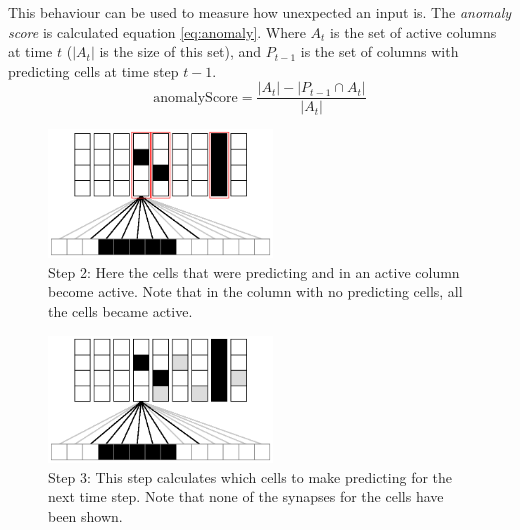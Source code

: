 \documentclass[a4paper]{jpconf}
\begin{document}
		This behaviour can be used to measure how unexpected an input is. The \emph{anomaly score} is calculated equation \ref{eq:anomaly}. Where $A_t$ is the set of active columns at time $t$ ($|A_t|$ is the size of this set), and $P_{t-1}$ is the set of columns with predicting cells at time step $t-1$.
		\begin{equation}\label{eq:anomaly}
		\mathrm{anomalyScore} = \frac{| A_t| - |P_{t-1} \cap A_t |}{|A_t|}
		\end{equation}


\begin{figure}[h]
	\centering
	\includegraphics[width=0.53\textwidth]{algorithmDiagramStep2.eps}\hspace{1pc}%
	\begin{minipage}[b]{0.3\textwidth}
	\caption{Step 2: Here the cells that were predicting and in an active column become active. Note that in the column with no predicting cells, all the cells became active.}\label{fig:algorithmDiagramStep2}
	\end{minipage}
\end{figure}

\begin{figure}[h]
	\centering
	\includegraphics[width=0.53\textwidth]{algorithmDiagramStep3.eps}\hspace{1pc}%
	\begin{minipage}[b]{0.3\textwidth}
	\caption{Step 3: This step calculates which cells to make predicting for the next time step. Note that none of the synapses for the cells have been shown.}\label{fig:algorithmDiagramStep3}
	\end{minipage}
\end{figure}
\end{document}
